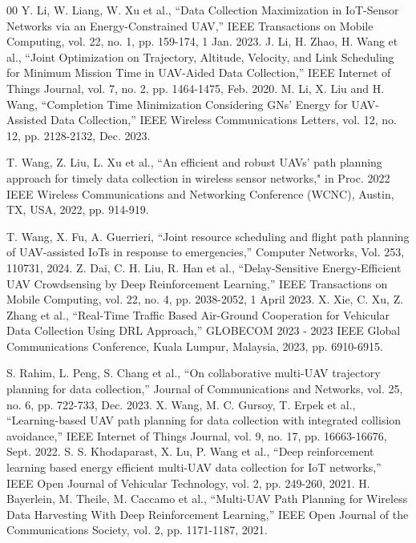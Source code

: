 \documentclass[conference]{IEEEtran}
\begin{document}
\begin{thebibliography}{00}
 Y. Li, W. Liang, W. Xu et al., ``Data Collection Maximization in IoT-Sensor Networks via an Energy-Constrained UAV,'' IEEE Transactions on Mobile Computing, vol. 22, no. 1, pp. 159-174, 1 Jan. 2023.
J. Li, H. Zhao, H. Wang et al., ``Joint Optimization on Trajectory, Altitude, Velocity, and Link Scheduling for Minimum Mission Time in UAV-Aided Data Collection,'' IEEE Internet of Things Journal, vol. 7, no. 2, pp. 1464-1475, Feb. 2020. 
 M. Li, X. Liu and H. Wang, ``Completion Time Minimization Considering GNs' Energy for UAV-Assisted Data Collection,'' IEEE Wireless Communications Letters, vol. 12, no. 12, pp. 2128-2132, Dec. 2023. 
    
 T. Wang, Z. Liu, L. Xu et al., ``An efficient and robust UAVs’ path planning approach for timely data collection in wireless sensor networks," in Proc. 2022 IEEE Wireless Communications and Networking Conference (WCNC), Austin, TX, USA, 2022, pp. 914-919. 

 T. Wang, X. Fu, A. Guerrieri, ``Joint resource scheduling and flight path planning of UAV-assisted IoTs in response to emergencies,'' Computer Networks, Vol. 253, 110731, 2024. 
 Z. Dai, C. H. Liu, R. Han et al., ``Delay-Sensitive Energy-Efficient UAV Crowdsensing by Deep Reinforcement Learning,'' IEEE Transactions on Mobile Computing, vol. 22, no. 4, pp. 2038-2052, 1 April 2023. 
 X. Xie, C. Xu, Z. Zhang et al., ``Real-Time Traffic Based Air-Ground Cooperation for Vehicular Data Collection Using DRL Approach,'' GLOBECOM 2023 - 2023 IEEE Global Communications Conference, Kuala Lumpur, Malaysia, 2023, pp. 6910-6915. 
    
 S. Rahim, L. Peng, S. Chang et al., ``On collaborative multi-UAV trajectory planning for data collection,'' Journal of Communications and Networks, vol. 25, no. 6, pp. 722-733, Dec. 2023. 
 X. Wang, M. C. Gursoy, T. Erpek et al., ``Learning-based UAV path planning for data collection with integrated collision avoidance,'' IEEE Internet of Things Journal, vol. 9, no. 17, pp. 16663-16676, Sept. 2022. 
 S. S. Khodaparast, X. Lu, P. Wang et al., ``Deep reinforcement learning based energy efficient multi-UAV data collection for IoT networks,'' IEEE Open Journal of Vehicular Technology, vol. 2, pp. 249-260, 2021.
 H. Bayerlein, M. Theile, M. Caccamo et al., ``Multi-UAV Path Planning for Wireless Data Harvesting With Deep Reinforcement Learning,'' IEEE Open Journal of the Communications Society, vol. 2, pp. 1171-1187, 2021. 
    

\end{thebibliography}
\end{document}
